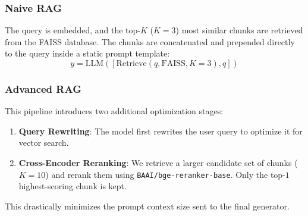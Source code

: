 \documentclass[conference]{IEEEtran}
\begin{document}
\subsubsection{Naive RAG}
The query is embedded, and the top-$K$ ($K=3$) most similar chunks are retrieved from the FAISS database. The chunks are concatenated and prepended directly to the query inside a static prompt template:
\begin{equation}
y = \text{LLM}([\text{Retrieve}(q, \text{FAISS}, K=3), q])
\end{equation}
\subsubsection{Advanced RAG}
This pipeline introduces two additional optimization stages:
\begin{enumerate}
    \item \textbf{Query Rewriting}: The model first rewrites the user query to optimize it for vector search.
    \item \textbf{Cross-Encoder Reranking}: We retrieve a larger candidate set of chunks ($K=10$) and rerank them using \texttt{BAAI/bge-reranker-base}. Only the top-$1$ highest-scoring chunk is kept.
\end{enumerate}
This drastically minimizes the prompt context size sent to the final generator.
\end{document}
